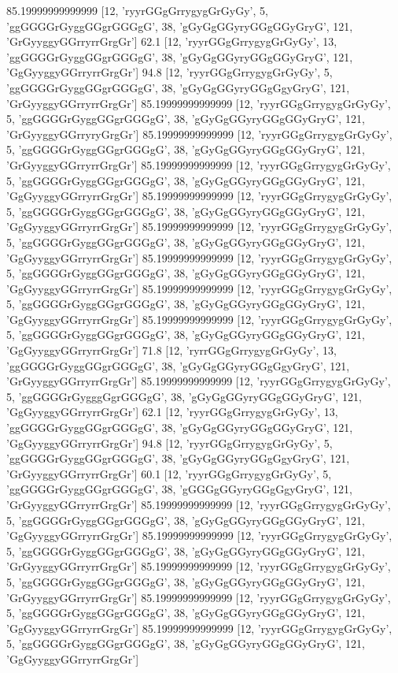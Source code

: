 85.19999999999999 [12, 'ryyrGGgGrrygygGrGyGy', 5, 'ggGGGGrGyggGGgrGGGgG', 38, 'gGyGgGGyryGGgGGyGryG', 121, 'GrGyyggyGGrryrrGrgGr']
62.1 [12, 'ryyrGGgGrrygygGrGyGy', 13, 'ggGGGGrGyggGGgrGGGgG', 38, 'gGyGgGGyryGGgGGyGryG', 121, 'GgGyyggyGGrryrrGrgGr']
94.8 [12, 'ryyrGGgGrrygygGrGyGy', 5, 'ggGGGGrGyggGGgrGGGgG', 38, 'gGyGgGGyryGGgGgyGryG', 121, 'GrGyyggyGGrryrrGrgGr']
85.19999999999999 [12, 'ryyrGGgGrrygygGrGyGy', 5, 'ggGGGGrGyggGGgrGGGgG', 38, 'gGyGgGGyryGGgGGyGryG', 121, 'GrGyyggyGGrryryGrgGr']
85.19999999999999 [12, 'ryyrGGgGrrygygGrGyGy', 5, 'ggGGGGrGyggGGgrGGGgG', 38, 'gGyGgGGyryGGgGGyGryG', 121, 'GrGyyggyGGrryrrGrgGr']
85.19999999999999 [12, 'ryyrGGgGrrygygGrGyGy', 5, 'ggGGGGrGyggGGgrGGGgG', 38, 'gGyGgGGyryGGgGGyGryG', 121, 'GgGyyggyGGrryrrGrgGr']
85.19999999999999 [12, 'ryyrGGgGrrygygGrGyGy', 5, 'ggGGGGrGyggGGgrGGGgG', 38, 'gGyGgGGyryGGgGGyGryG', 121, 'GgGyyggyGGrryrrGrgGr']
85.19999999999999 [12, 'ryyrGGgGrrygygGrGyGy', 5, 'ggGGGGrGyggGGgrGGGgG', 38, 'gGyGgGGyryGGgGGyGryG', 121, 'GgGyyggyGGrryrrGrgGr']
85.19999999999999 [12, 'ryyrGGgGrrygygGrGyGy', 5, 'ggGGGGrGyggGGgrGGGgG', 38, 'gGyGgGGyryGGgGGyGryG', 121, 'GgGyyggyGGrryrrGrgGr']
85.19999999999999 [12, 'ryyrGGgGrrygygGrGyGy', 5, 'ggGGGGrGyggGGgrGGGgG', 38, 'gGyGgGGyryGGgGGyGryG', 121, 'GgGyyggyGGrryrrGrgGr']
85.19999999999999 [12, 'ryyrGGgGrrygygGrGyGy', 5, 'ggGGGGrGyggGGgrGGGgG', 38, 'gGyGgGGyryGGgGGyGryG', 121, 'GgGyyggyGGrryrrGrgGr']
71.8 [12, 'ryrrGGgGrrygygGrGyGy', 13, 'ggGGGGrGyggGGgrGGGgG', 38, 'gGyGgGGyryGGgGgyGryG', 121, 'GrGyyggyGGrryrrGrgGr']
85.19999999999999 [12, 'ryyrGGgGrrygygGrGyGy', 5, 'ggGGGGrGygggGgrGGGgG', 38, 'gGyGgGGyryGGgGGyGryG', 121, 'GgGyyggyGGrryrrGrgGr']
62.1 [12, 'ryyrGGgGrrygygGrGyGy', 13, 'ggGGGGrGyggGGgrGGGgG', 38, 'gGyGgGGyryGGgGGyGryG', 121, 'GgGyyggyGGrryrrGrgGr']
94.8 [12, 'ryyrGGgGrrygygGrGyGy', 5, 'ggGGGGrGyggGGgrGGGgG', 38, 'gGyGgGGyryGGgGgyGryG', 121, 'GrGyyggyGGrryrrGrgGr']
60.1 [12, 'ryyrGGgGrrygygGrGyGy', 5, 'ggGGGGrGyggGGgrGGGgG', 38, 'gGGGgGGyryGGgGgyGryG', 121, 'GrGyyggyGGrryrrGrgGr']
85.19999999999999 [12, 'ryyrGGgGrrygygGrGyGy', 5, 'ggGGGGrGyggGGgrGGGgG', 38, 'gGyGgGGyryGGgGGyGryG', 121, 'GgGyyggyGGrryrrGrgGr']
85.19999999999999 [12, 'ryyrGGgGrrygygGrGyGy', 5, 'ggGGGGrGyggGGgrGGGgG', 38, 'gGyGgGGyryGGgGGyGryG', 121, 'GrGyyggyGGrryrrGrgGr']
85.19999999999999 [12, 'ryyrGGgGrrygygGrGyGy', 5, 'ggGGGGrGyggGGgrGGGgG', 38, 'gGyGgGGyryGGgGGyGryG', 121, 'GrGyyggyGGrryrrGrgGr']
85.19999999999999 [12, 'ryyrGGgGrrygygGrGyGy', 5, 'ggGGGGrGyggGGgrGGGgG', 38, 'gGyGgGGyryGGgGGyGryG', 121, 'GgGyyggyGGrryrrGrgGr']
85.19999999999999 [12, 'ryyrGGgGrrygygGrGyGy', 5, 'ggGGGGrGyggGGgrGGGgG', 38, 'gGyGgGGyryGGgGGyGryG', 121, 'GgGyyggyGGrryrrGrgGr']
